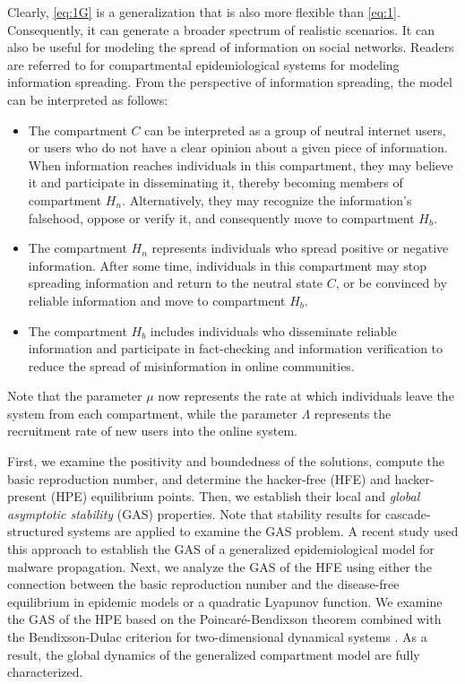 \documentclass[11pt]{article}
\theoremstyle{definition}
\theoremstyle{remark}
\numberwithin{equation}{section}
\begin{document}
Clearly, \eqref{eq:1G} is a generalization that is also more flexible than \eqref{eq:1}. 
Consequently, it can generate a broader spectrum of realistic scenarios.  It can also be useful for modeling the spread of information on social networks. 
Readers are referred to \cite{Bhattacharya, Daley, Dietz, Goffman, Piqueira4} for compartmental epidemiological systems for modeling information spreading.
From the perspective of information spreading, the model can be interpreted as follows:
\begin{itemize}
\item The compartment $C$ can be interpreted as a group of neutral internet users, or users who do not have a clear opinion about a given piece of information. 
When information reaches individuals in this compartment, they may believe it and participate in disseminating it, thereby becoming members of compartment $H_n$. 
Alternatively, they may recognize the information's falsehood, oppose or verify it, and consequently move to compartment $H_b$.
\item The compartment $H_n$ represents individuals who spread positive or negative information. 
After some time, individuals in this compartment may stop spreading information and return to the neutral state $C$, or be convinced by reliable information and move to compartment $H_b$.
\item The compartment $H_b$ includes individuals who disseminate reliable information and participate in fact-checking and information verification to reduce the spread of misinformation in online communities.
\end{itemize}
Note that the parameter $\mu$ now represents the rate at which individuals leave the system from each compartment, 
while the parameter  $\Lambda$ represents the recruitment rate of new users into the online system.
%

First, we examine the positivity and boundedness of the solutions, compute the basic reproduction number, and determine the hacker-free (HFE) and hacker-present (HPE) equilibrium points. 
Then, we establish their local and \textit{global asymptotic stability} (GAS) properties. 
Note that stability results for cascade-structured systems \cite{Seibert} are applied to examine the GAS problem. 
A recent study \cite{Hoang2026} used this approach to establish the GAS of a generalized epidemiological model for malware propagation.
Next, we analyze the GAS of the HFE using either the connection between the basic reproduction number and the disease-free equilibrium in epidemic models \cite{Castillo-Chavez} 
or a quadratic Lyapunov function.
We examine the GAS of the HPE based on the Poincar\'e-Bendixson theorem combined with the Bendixson-Dulac criterion for two-dimensional dynamical systems \cite{Allen, Martcheva}.
As a result, the global dynamics of the generalized compartment model are fully characterized.
\end{document}
